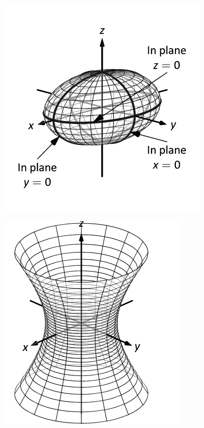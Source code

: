 \documentclass[10pt]{article}
\begin{document}
\includegraphics{figquadric_ellipsoidb_3DBW.pdf}
\texttt{}

\includegraphics{figquadric_hyp_one_sheet_3DBW.pdf}
\texttt{}
\end{document}
